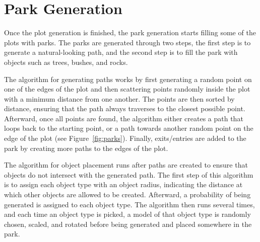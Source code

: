 \section{Park Generation}

Once the plot generation is finished, the park generation starts filling some of the plots with parks.
The parks are generated through two steps, the first step is to generate a natural-looking path, and the second step is to fill the park with objects such as trees, bushes, and rocks.

The algorithm for generating paths works by first generating a random point on one of the edges of the plot and then scattering points randomly inside the plot with a minimum distance from one another.
The points are then sorted by distance, ensuring that the path always traverses to the closest possible point.
Afterward, once all points are found, the algorithm either creates a path that loops back to the starting point, or a path towards another random point on the edge of the plot (see Figure~\ref{fig:parks}).
Finally, exits/entries are added to the park by creating more paths to the edges of the plot.

The algorithm for object placement runs after paths are created to ensure that objects do not intersect with the generated path.
The first step of this algorithm is to assign each object type with an object radius, indicating the distance at which other objects are allowed to be created.
Afterward, a probability of being generated is assigned to each object type.
The algorithm then runs several times, and each time an object type is picked, a model of that object type is randomly chosen, scaled, and rotated before being generated and placed somewhere in the park.

